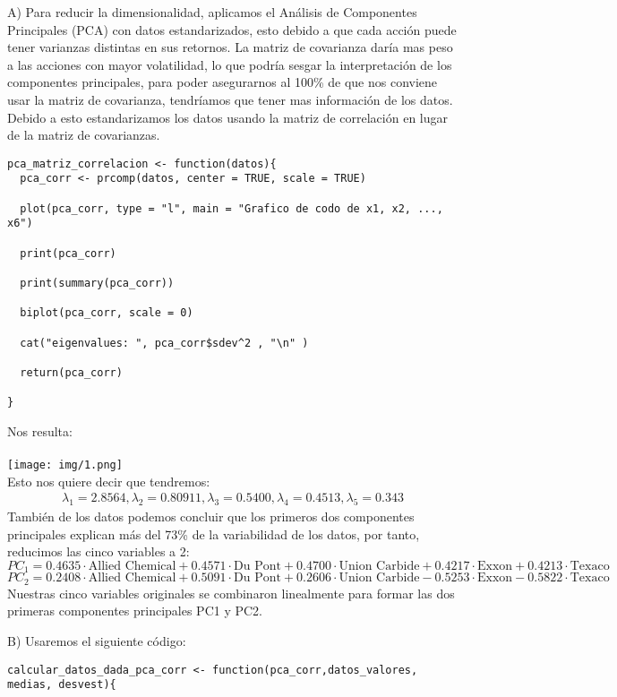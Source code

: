 \begin{sol}A)
Para reducir la dimensionalidad, aplicamos el Análisis de Componentes Principales (PCA) con datos estandarizados, esto debido a que cada acción puede tener varianzas distintas en sus retornos. La matriz de covarianza daría mas peso a las acciones con mayor volatilidad, lo que podría sesgar la interpretación de los componentes principales, para poder asegurarnos al 100\% de que nos conviene usar la matriz de covarianza, tendríamos que tener mas información de los datos. Debido a esto estandarizamos los datos usando la matriz de correlación en lugar de la matriz de covarianzas. 
\begin{verbatim}
pca_matriz_correlacion <- function(datos){
  pca_corr <- prcomp(datos, center = TRUE, scale = TRUE)

  plot(pca_corr, type = "l", main = "Grafico de codo de x1, x2, ..., x6")

  print(pca_corr)

  print(summary(pca_corr))

  biplot(pca_corr, scale = 0)

  cat("eigenvalues: ", pca_corr$sdev^2 , "\n" )

  return(pca_corr)

}
\end{verbatim}
Nos resulta:\\\\
\texttt{[image: img/1.png]}\\
Esto nos quiere decir que tendremos:
\begin{align*}
\lambda_1 = 2.8564, \lambda_2 = 0.80911, \lambda_3 = 0.5400, \lambda_4 = 0.4513 , \lambda_5 = 0.343
\end{align*}
También de los datos podemos concluir que los primeros dos componentes principales explican más del 73\% de la variabilidad de los datos, por tanto, reducimos las cinco variables a 2:
\[
PC_1 = 0.4635 \cdot \text{Allied Chemical} + 0.4571 \cdot \text{Du Pont} + 0.4700 \cdot \text{Union Carbide} + 0.4217 \cdot \text{Exxon} + 0.4213 \cdot \text{Texaco}
\]
\[
PC_2 = 0.2408 \cdot \text{Allied Chemical} + 0.5091 \cdot \text{Du Pont} + 0.2606 \cdot \text{Union Carbide} - 0.5253 \cdot \text{Exxon} - 0.5822 \cdot \text{Texaco}
\]
Nuestras cinco variables originales se combinaron linealmente para formar las dos primeras componentes principales PC1 y PC2.

\pagebreak

B) Usaremos el siguiente código: 
\begin{verbatim}
calcular_datos_dada_pca_corr <- function(pca_corr,datos_valores, medias, desvest){


\end{verbatim}
\end{sol}
